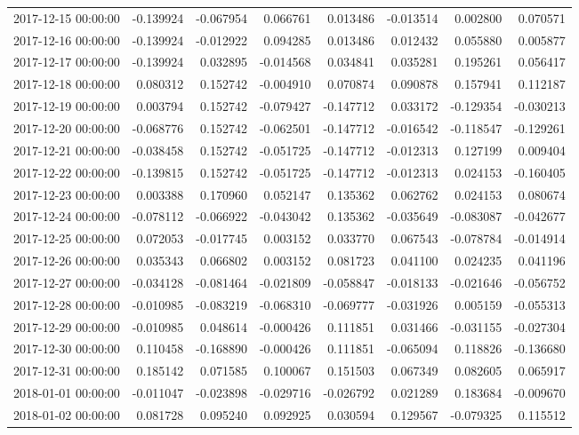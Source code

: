 \begin{tabular}{lrrrrrrr}
2017-12-15 00:00:00 & -0.139924 & -0.067954 & 0.066761 & 0.013486 & -0.013514 & 0.002800 & 0.070571 \\
2017-12-16 00:00:00 & -0.139924 & -0.012922 & 0.094285 & 0.013486 & 0.012432 & 0.055880 & 0.005877 \\
2017-12-17 00:00:00 & -0.139924 & 0.032895 & -0.014568 & 0.034841 & 0.035281 & 0.195261 & 0.056417 \\
2017-12-18 00:00:00 & 0.080312 & 0.152742 & -0.004910 & 0.070874 & 0.090878 & 0.157941 & 0.112187 \\
2017-12-19 00:00:00 & 0.003794 & 0.152742 & -0.079427 & -0.147712 & 0.033172 & -0.129354 & -0.030213 \\
2017-12-20 00:00:00 & -0.068776 & 0.152742 & -0.062501 & -0.147712 & -0.016542 & -0.118547 & -0.129261 \\
2017-12-21 00:00:00 & -0.038458 & 0.152742 & -0.051725 & -0.147712 & -0.012313 & 0.127199 & 0.009404 \\
2017-12-22 00:00:00 & -0.139815 & 0.152742 & -0.051725 & -0.147712 & -0.012313 & 0.024153 & -0.160405 \\
2017-12-23 00:00:00 & 0.003388 & 0.170960 & 0.052147 & 0.135362 & 0.062762 & 0.024153 & 0.080674 \\
2017-12-24 00:00:00 & -0.078112 & -0.066922 & -0.043042 & 0.135362 & -0.035649 & -0.083087 & -0.042677 \\
2017-12-25 00:00:00 & 0.072053 & -0.017745 & 0.003152 & 0.033770 & 0.067543 & -0.078784 & -0.014914 \\
2017-12-26 00:00:00 & 0.035343 & 0.066802 & 0.003152 & 0.081723 & 0.041100 & 0.024235 & 0.041196 \\
2017-12-27 00:00:00 & -0.034128 & -0.081464 & -0.021809 & -0.058847 & -0.018133 & -0.021646 & -0.056752 \\
2017-12-28 00:00:00 & -0.010985 & -0.083219 & -0.068310 & -0.069777 & -0.031926 & 0.005159 & -0.055313 \\
2017-12-29 00:00:00 & -0.010985 & 0.048614 & -0.000426 & 0.111851 & 0.031466 & -0.031155 & -0.027304 \\
2017-12-30 00:00:00 & 0.110458 & -0.168890 & -0.000426 & 0.111851 & -0.065094 & 0.118826 & -0.136680 \\
2017-12-31 00:00:00 & 0.185142 & 0.071585 & 0.100067 & 0.151503 & 0.067349 & 0.082605 & 0.065917 \\
2018-01-01 00:00:00 & -0.011047 & -0.023898 & -0.029716 & -0.026792 & 0.021289 & 0.183684 & -0.009670 \\
2018-01-02 00:00:00 & 0.081728 & 0.095240 & 0.092925 & 0.030594 & 0.129567 & -0.079325 & 0.115512 \\

\end{tabular}

